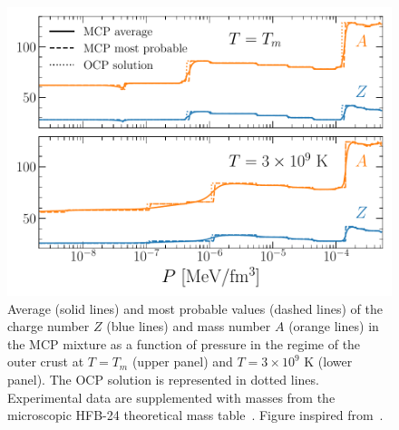 \begin{figure}[!t]
  \begin{center}
    \includegraphics[width=0.9\linewidth]{figures/compo_mcp_ocrust.pdf}
  \end{center}
  \caption[Equilibrium composition of the multicomponent plasma versus pressure
  in the outer-crust regime]{
    Average (solid lines) and most probable values (dashed lines) of the charge 
    number $Z$ (blue lines) and mass number $A$ (orange lines) in the MCP 
    mixture as a function of pressure in the regime of the outer crust at 
    $T=T_m$ (upper panel) and $T=3\times 10^9$ \si{\kelvin} (lower panel). 
    The OCP solution is represented in dotted lines.
    Experimental data are supplemented with masses from the microscopic 
    HFB-24 theoretical mass table~\cite{Goriely2013}. 
  Figure inspired from~\cite{Fantina2020}.}\label{fig:compo_mcp_ocrust}
\end{figure}


